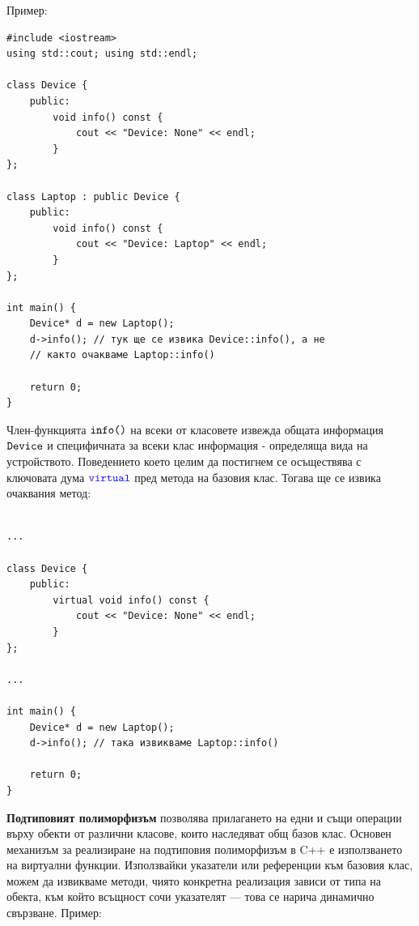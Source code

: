 \documentclass{article}
\begin{document}
Пример:
\begin{lstlisting}[style=cpp]
#include <iostream>
using std::cout; using std::endl;

class Device {
    public:
        void info() const {
            cout << "Device: None" << endl;
        }
};

class Laptop : public Device {
    public:
        void info() const {
            cout << "Device: Laptop" << endl;
        }
};

int main() {
    Device* d = new Laptop();
    d->info(); // тук ще се извика Device::info(), а не
    // както очакваме Laptop::info()

    return 0;
}
\end{lstlisting}
Член-функцията $\textcolor{black}{\texttt{info()}}$ на всеки от класовете извежда общата информация $\textcolor{black}{\texttt{Device}}$ и специфичната за всеки клас
информация - определяща вида на устройството. Поведението което целим да постигнем се осъществява с ключовата дума
$\textcolor{blue}{\texttt{virtual}}$ пред метода на базовия клас. Тогава ще се извика очаквания метод:
\begin{lstlisting}[style=cpp]

...

class Device {
    public:
        virtual void info() const {
            cout << "Device: None" << endl;
        }
};

...

int main() {
    Device* d = new Laptop();
    d->info(); // така извикваме Laptop::info()

    return 0;
}
\end{lstlisting}
\textbf{Подтиповият полиморфизъм} позволява прилагането на едни и същи операции върху обекти от различни класове, които наследяват общ базов клас.
Основен механизъм за реализиране на подтиповия полиморфизъм в C++ е използването на виртуални функции. Използвайки указатели или референции
към базовия клас, можем да извикваме методи, чиято конкретна реализация зависи от типа на обекта, към който всъщност сочи указателят — това
се нарича динамично свързване. \newline\newline
Пример:
\end{document}
